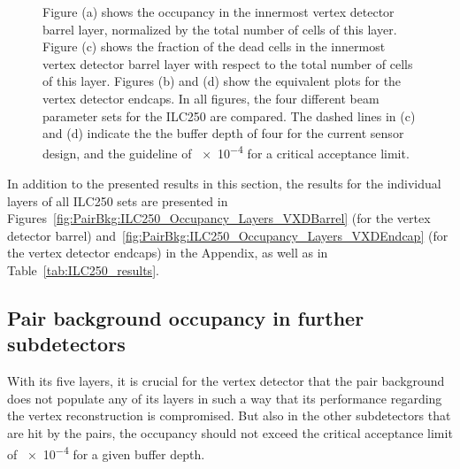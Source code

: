 \begin{figure}
{   Figure (a) shows the occupancy in the innermost vertex detector barrel layer, normalized by the total number of cells of this layer.
   Figure (c) shows the fraction of the dead cells in the innermost vertex detector barrel layer with respect to the total number of cells of this layer.
   Figures (b) and (d) show the equivalent plots for the vertex detector endcaps.
   In all figures, the four different beam parameter sets for the ILC250 are compared.
   The dashed lines in (c) and (d) indicate the the buffer depth of four for the current sensor design, and the guideline of \num{e-4} for a critical acceptance limit.
   }
   \label{fig:PairBkg:ILC250_Occupancy_Layer0}
 \end{figure}

 In addition to the presented results in this section, the results for the individual layers of all ILC250 sets are presented in Figures~\ref{fig:PairBkg:ILC250_Occupancy_Layers_VXDBarrel} (for the vertex detector barrel) and~\ref{fig:PairBkg:ILC250_Occupancy_Layers_VXDEndcap} (for the vertex detector endcaps) in the Appendix, as well as in Table~\ref{tab:ILC250_results}.


\subsection{Pair background occupancy in further \sid subdetectors}
\label{PairBkg:further_subdetectors}

With its five layers, it is crucial for the vertex detector that the pair background does not populate any of its layers in such a way that its performance regarding the vertex reconstruction is compromised. 
But also in the other \sid subdetectors that are hit by the \positron\electron pairs, the occupancy should not exceed the critical acceptance limit of \num{e-4} for a given buffer depth.

